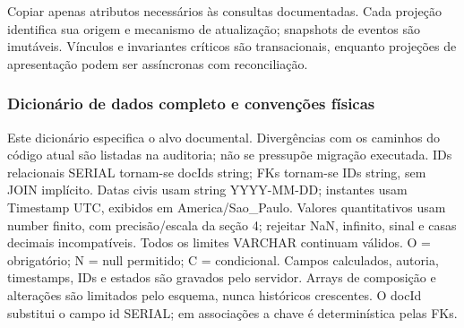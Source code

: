 \begin{regra}
Copiar apenas atributos necessários às consultas documentadas. Cada projeção identifica sua origem e mecanismo de atualização; snapshots de eventos são imutáveis. Vínculos e invariantes críticos são transacionais, enquanto projeções de apresentação podem ser assíncronas com reconciliação.
\end{regra}


\normalsize
\begingroup
\sloppy
\subsubsection{Dicionário de dados completo e convenções físicas}
\label{sec:dicionario}
Este dicionário especifica o alvo documental. Divergências com os caminhos do código atual são listadas na auditoria; não se pressupõe migração executada. IDs relacionais SERIAL tornam-se docIds string; FKs tornam-se IDs string, sem JOIN implícito. Datas civis usam string YYYY-MM-DD; instantes usam Timestamp UTC, exibidos em America/Sao\_Paulo. Valores quantitativos usam number finito, com precisão/escala da seção 4; rejeitar NaN, infinito, sinal e casas decimais incompatíveis. Todos os limites VARCHAR continuam válidos. O = obrigatório; N = null permitido; C = condicional. Campos calculados, autoria, timestamps, IDs e estados são gravados pelo servidor. Arrays de composição e alterações são limitados pelo esquema, nunca históricos crescentes. O docId substitui o campo id SERIAL; em associações a chave é determinística pelas FKs.

